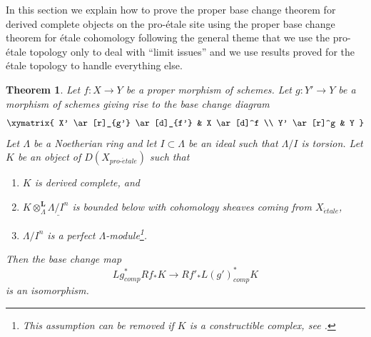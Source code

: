 \documentclass[10pt,a4paper]{article}
\theoremstyle{plain}
\newtheorem{theorem}[subsection]{Theorem}
\theoremstyle{definition}
\theoremstyle{remark}
\numberwithin{equation}{subsection}
\def\proetale{{pro\text{-}\acute{e}tale}}
\def\etale{{\acute{e}tale}}
\begin{document}
\noindent
In this section we explain how to prove the proper base change theorem
for derived complete objects on the pro-\'etale site using the proper
base change theorem for \'etale cohomology following the general theme
that we use the pro-\'etale topology only to deal with ``limit issues''
and we use results proved for the \'etale topology to handle everything
else.

\begin{theorem}
\label{theorem-proper-base-change}
Let $f : X \to Y$ be a proper morphism of schemes. Let $g : Y' \to Y$ be
a morphism of schemes giving rise to the base change diagram
$$
\xymatrix{
X' \ar[r]_{g'} \ar[d]_{f'} & X \ar[d]^f \\
Y' \ar[r]^g & Y
}
$$
Let $\Lambda$ be a Noetherian ring and let $I \subset \Lambda$ be an ideal
such that $\Lambda/I$ is torsion. Let $K$ be an object
of $D(X_\proetale)$ such that
\begin{enumerate}
\item $K$ is derived complete, and
\item $K \otimes_\Lambda^\mathbf{L} \underline{\Lambda/I^n}$ is
bounded below with cohomology sheaves coming from $X_\etale$,
\item $\Lambda/I^n$ is a perfect $\Lambda$-module\footnote{This assumption
can be removed if $K$ is a constructible complex, see \cite{BS}.}.
\end{enumerate}
Then the base change map
$$
Lg_{comp}^*Rf_*K \longrightarrow Rf'_*L(g')^*_{comp}K
$$
is an isomorphism.
\end{theorem}
\end{document}
